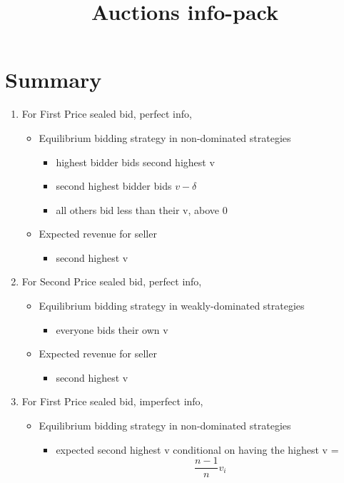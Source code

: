 \documentclass[10pt, a4paper]{article}
\begin{document}
\title{Auctions info-pack}

\section{Summary}
\begin{enumerate}
   \item For First Price sealed bid, perfect info, 
      \begin{itemize}
         \item Equilibrium bidding strategy in non-dominated strategies
             \begin{itemize}
                \item highest bidder bids second highest v 
                \item second highest bidder bids $v - \delta$
                \item all others bid less than their v, above 0
             \end{itemize}
         \item Expected revenue for seller
             \begin{itemize}
                \item second highest v
             \end{itemize}
      \end{itemize}
   \item For Second Price sealed bid, perfect info, 
      \begin{itemize}
         \item Equilibrium bidding strategy in weakly-dominated strategies
             \begin{itemize}
                \item everyone bids their own v
             \end{itemize}
         \item Expected revenue for seller 
             \begin{itemize}
                \item second highest v
             \end{itemize}
      \end{itemize}
   \item For First Price sealed bid, imperfect info, 
      \begin{itemize}
         \item Equilibrium bidding strategy in non-dominated strategies
             \begin{itemize}
                \item expected second highest v conditional on having the highest v =\[\frac{n-1}{n}v_i\]

\end{itemize}
\end{itemize}
\end{enumerate}
\end{document}
